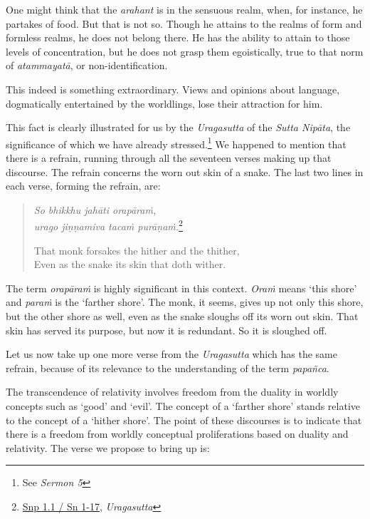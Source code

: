 One might think that the \emph{arahant} is in the sensuous realm, when, for instance, he partakes of food. But that is not so. Though he attains to the realms of form and formless realms, he does not belong there. He has the ability to attain to those levels of concentration, but he does not grasp them egoistically, true to that norm of \emph{atammayatā}, or non-identification.

This indeed is something extraordinary. Views and opinions about language, dogmatically entertained by the worldlings, lose their attraction for him.

This fact is clearly illustrated for us by the \emph{Uragasutta} of the \emph{Sutta Nipāta}, the significance of which we have already stressed.\footnote{See \emph{Sermon 5}} We happened to mention that there is a refrain, running through all the seventeen verses making up that discourse. The refrain concerns the worn out skin of a snake. The last two lines in each verse, forming the refrain, are:

\begin{quote}
\emph{So bhikkhu jahāti orapāraṁ,}\\
\emph{urago jiṇṇamiva tacaṁ purāṇaṁ.}\footnote{\href{https://suttacentral.net/snp1.1/pli/ms}{Snp 1.1 / Sn 1-17}, \emph{Uragasutta}}

That monk forsakes the hither and the thither,\\
Even as the snake its skin that doth wither.
\end{quote}

The term \emph{orapāraṁ} is highly significant in this context. \emph{Oraṁ} means `this shore' and \emph{paraṁ} is the `farther shore'. The monk, it seems, gives up not only this shore, but the other shore as well, even as the snake sloughs off its worn out skin. That skin has served its purpose, but now it is redundant. So it is sloughed off.

Let us now take up one more verse from the \emph{Uragasutta} which has the same refrain, because of its relevance to the understanding of the term \emph{papañca}.

The transcendence of relativity involves freedom from the duality in worldly concepts such as `good' and `evil'. The concept of a `farther shore' stands relative to the concept of a `hither shore'. The point of these discourses is to indicate that there is a freedom from worldly conceptual proliferations based on duality and relativity. The verse we propose to bring up is:

